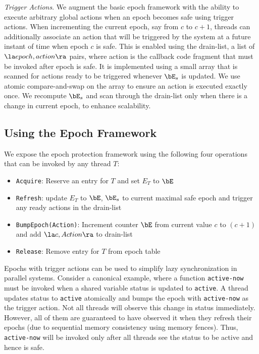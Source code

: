 \documentclass[11pt]{article}
\begin{document}
\emph{Trigger Actions}. We augment the basic epoch framework with the ability to execute arbitrary global
actions when an epoch becomes safe using trigger actions. When incrementing the current epoch, say
from \(c\) to \(c+1\), threads can additionally associate an action that will be triggered by the
system at a future instant of time when epoch \(c\) is safe. This is enabled using the drain-list, a
list of \(\la epoch,action\ra\) pairs, where action is the callback code fragment that must be invoked
after epoch is safe. It is implemented using a small array that is scanned for actions ready to be
triggered whenever \(\bE_s\) is updated. We use atomic compare-and-swap on the array to ensure an
action is executed exactly once. We recompute \(\bE_s\) and scan through the drain-list only when
there is a change in current epoch, to enhance scalability.
\subsection{Using the Epoch Framework}
\label{sec:org72926d2}
We expose the epoch protection framework using the following four operations that can be invoked by
any thread \(T\):
\begin{itemize}
\item \texttt{Acquire}: Reserve an entry for \(T\) and set \(E_T\) to \(\bE\)
\item \texttt{Refresh}: update \(E_T\) to \(\bE\), \(\bE_s\) to current maximal safe epoch and trigger any ready
actions in the drain-list
\item \texttt{BumpEpoch(Action)}: Increment counter \(\bE\) from current value \(c\) to \((c+1)\) and add
\(\la c,Action\ra\) to drain-list
\item \texttt{Release}: Remove entry for \(T\) from epoch table
\end{itemize}

Epochs with trigger actions can be used to simplify lazy synchronization in parallel systems. Consider
a canonical example, where a function \texttt{active-now} must be invoked when a shared variable status is
updated to \texttt{active}. A thread updates status to \texttt{active} atomically and bumps the epoch with \texttt{active-now} as
the trigger action. Not all threads will observe this change in status immediately. However, all of
them are guaranteed to have observed it when they refresh their epochs (due to sequential memory
consistency using memory fences). Thus, \texttt{active-now} will be invoked only after all threads see the
status to be active and hence is safe.
\end{document}
